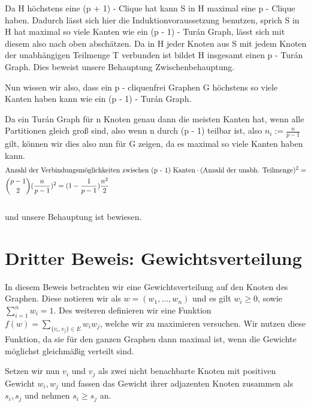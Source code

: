 \documentclass[12pt, a4paper]{article}
\begin{document}
Da H höchstens eine (p + 1) - Clique hat kann S in H maximal eine p - Clique haben. Dadurch lässt sich hier die Induktionvoraussetzung benutzen, sprich S in H hat maximal so viele Kanten wie ein (p - 1) - Turán Graph, lässt sich mit diesem also nach oben abschätzen. Da in H jeder Knoten aus S mit jedem Knoten der unabhängigen Teilmenge T verbunden ist bildet H insgesamt einen p - Turán Graph. Dies beweist unsere Behauptung Zwischenbehauptung.

Nun wissen wir also, dass ein p - cliquenfrei Graphen G höchstens so viele Kanten haben kann wie ein (p - 1) - Turán Graph.

Da ein Turán Graph für n Knoten genau dann die meisten Kanten hat, wenn alle Partitionen gleich groß sind, also wenn n durch (p - 1) teilbar ist, also $n_i := \frac{n}{p-1}$ gilt, können wir dies also nun für G zeigen, da es maximal so viele Kanten haben kann.
\begin{gather}
\begin{split}&\text{Anzahl der Verbindungsmöglichkeiten zwischen (p - 1) Kanten} \cdot ( \text{Anzahl der unabh. Teilmenge} )^2 = \\ &{ p - 1 \choose 2 } ( \frac{n}{p-1} )^2 = (1 - \frac{1}{p - 1}) \frac{n^2}{2}\end{split}\notag\\\begin{split}\end{split}\notag
\end{gather}
und unsere Behauptung ist bewiesen.


\section{Dritter Beweis: Gewichtsverteilung}
\label{proof/third::doc}\label{proof/third:dritter-beweis-gewichtsverteilung}
In diesem Beweis betrachten wir eine Gewichtsverteilung auf den Knoten des Graphen. Diese notieren wir als $w = (w_1,...,w_n)$ und es gilt $w_i \ge 0$, sowie $\sum^n_{i=1}w_i = 1$. Des weiteren definieren wir eine Funktion $f(w) = \sum_{ \{v_i, v_j\} \in E} w_i w_j$, welche wir zu maximieren versuchen. Wir nutzen diese Funktion, da sie für den ganzen Graphen dann maximal ist, wenn die Gewichte möglichst gleichmäßig verteilt sind.

Setzen wir nun $v_i$ und $v_j$ als zwei nicht benachbarte Knoten mit positiven Gewicht $w_i, w_j$ und fassen das Gewicht ihrer adjazenten Knoten zusammen als $s_i, s_j$ und nehmen $s_i \ge s_j$ an.
\end{document}
